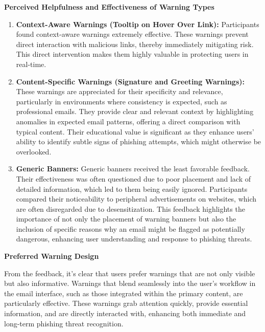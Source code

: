 \documentclass[
  a4paper,  %
  twoside,  %
  bibliography=totoc,
  headsepline,
  cleardoublepage=empty,
  parskip=half,
  draft=false
]{scrbook}
\begin{document}
\textbf{Perceived Helpfulness and Effectiveness of Warning Types}
\begin{enumerate}
    \item \textbf{Context-Aware Warnings (Tooltip on Hover Over Link):}
    Participants found context-aware warnings extremely effective. These warnings prevent direct interaction with malicious links, thereby immediately mitigating risk. This direct intervention makes them highly valuable in protecting users in real-time.
    \item \textbf{Content-Specific Warnings (Signature and Greeting Warnings):}
    These warnings are appreciated for their specificity and relevance, particularly in environments where consistency is expected, such as professional emails. They provide clear and relevant context by highlighting anomalies in expected email patterns, offering a direct comparison with typical content. Their educational value is significant as they enhance users' ability to identify subtle signs of phishing attempts, which might otherwise be overlooked.
    \item \textbf{Generic Banners:}
    Generic banners received the least favorable feedback. Their effectiveness was often questioned due to poor placement and lack of detailed information, which led to them being easily ignored. Participants compared their noticeability to peripheral advertisements on websites, which are often disregarded due to desensitization. This feedback highlights the importance of not only the placement of warning banners but also the inclusion of specific reasons why an email might be flagged as potentially dangerous, enhancing user understanding and response to phishing threats.
\end{enumerate}

\textbf{Preferred Warning Design}

From the feedback, it's clear that users prefer warnings that are not only visible but also informative. Warnings that blend seamlessly into the user's workflow in the email interface, such as those integrated within the primary content, are particularly effective. These warnings grab attention quickly, provide essential information, and are directly interacted with, enhancing both immediate and long-term phishing threat recognition.
\end{document}
